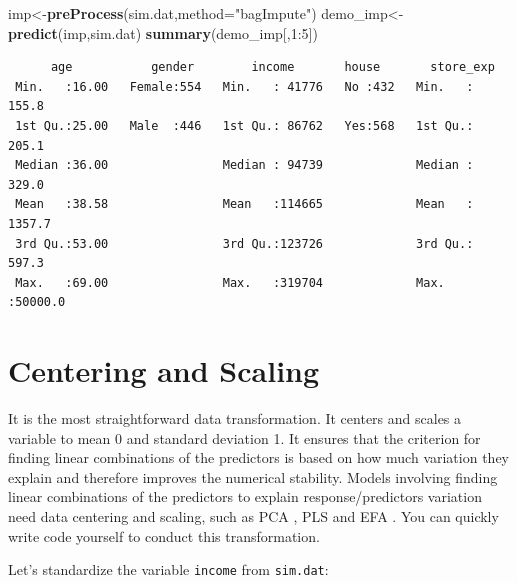 \documentclass[12pt,]{krantz}
\newenvironment{Shaded}{\begin{snugshade}}{\end{snugshade}}
\newcommand{\KeywordTok}[1]{\textcolor[rgb]{0.13,0.29,0.53}{\textbf{{#1}}}}
\newcommand{\DataTypeTok}[1]{\textcolor[rgb]{0.13,0.29,0.53}{{#1}}}
\newcommand{\DecValTok}[1]{\textcolor[rgb]{0.00,0.00,0.81}{{#1}}}
\newcommand{\StringTok}[1]{\textcolor[rgb]{0.31,0.60,0.02}{{#1}}}
\newcommand{\CommentTok}[1]{\textcolor[rgb]{0.56,0.35,0.01}{\textit{{#1}}}}
\newcommand{\NormalTok}[1]{{#1}}
\theoremstyle{definition}
\theoremstyle{definition}
\theoremstyle{remark}
\begin{document}
\begin{Shaded}
\begin{Highlighting}[]
\NormalTok{imp<-}\KeywordTok{preProcess}\NormalTok{(sim.dat,}\DataTypeTok{method=}\StringTok{"bagImpute"}\NormalTok{)}
\NormalTok{demo_imp<-}\KeywordTok{predict}\NormalTok{(imp,sim.dat)}
\KeywordTok{summary}\NormalTok{(demo_imp[,}\DecValTok{1}\NormalTok{:}\DecValTok{5}\NormalTok{])}
\end{Highlighting}
\end{Shaded}

\begin{verbatim}
      age           gender        income       house       store_exp      
 Min.   :16.00   Female:554   Min.   : 41776   No :432   Min.   :  155.8  
 1st Qu.:25.00   Male  :446   1st Qu.: 86762   Yes:568   1st Qu.:  205.1  
 Median :36.00                Median : 94739             Median :  329.0  
 Mean   :38.58                Mean   :114665             Mean   : 1357.7  
 3rd Qu.:53.00                3rd Qu.:123726             3rd Qu.:  597.3  
 Max.   :69.00                Max.   :319704             Max.   :50000.0  
\end{verbatim}

\section{Centering and Scaling}\label{centering-and-scaling}

It is the most straightforward data transformation. It centers and
scales a variable to mean 0 and standard deviation 1. It ensures that
the criterion for finding linear combinations of the predictors is based
on how much variation they explain and therefore improves the numerical
stability. Models involving finding linear combinations of the
predictors to explain response/predictors variation need data centering
and scaling, such as PCA \citep{pca1}, PLS \citep{PLS1} and EFA
\citep{EFA1}. You can quickly write code yourself to conduct this
transformation.

Let's standardize the variable \texttt{income} from \texttt{sim.dat}:

\begin{Shaded}
\end{Shaded}
\end{document}
